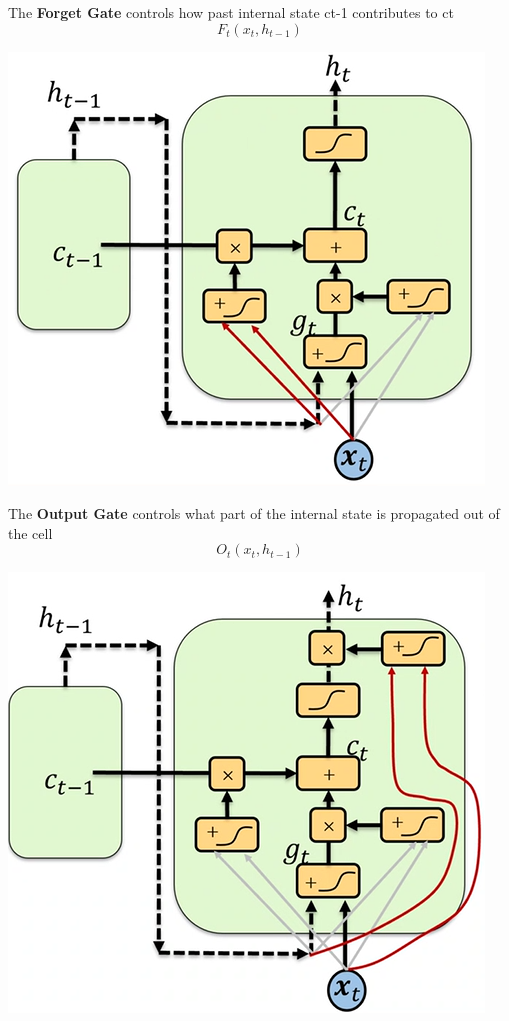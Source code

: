 \documentclass[10pt]{report}
\begin{document}
The \textbf{Forget Gate} controls how past internal state ct-1 contributes to ct $$F_t(x_t,h_{t-1})$$
\begin{center}
	\includegraphics[scale=0.33]{96.png}
\end{center}
The \textbf{Output Gate} controls what part of the internal state is propagated out of the cell $$O_t(x_t,h_{t-1})$$
\begin{center}
	\includegraphics[scale=0.5]{97.png}
\end{center}
\end{document}
